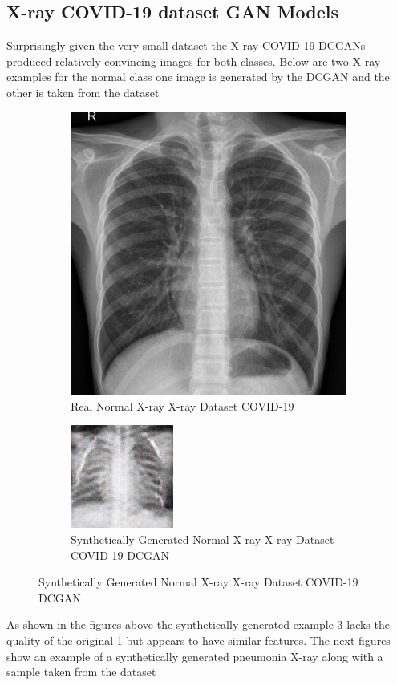 \subsection{X-ray COVID-19 dataset GAN Models}
Surprisingly given the very small dataset the X-ray COVID-19 DCGANs produced relatively convincing images for both classes.  Below are two X-ray examples for the normal class one image is generated by the DCGAN and the other is taken from the dataset
 \begin{figure}[H]
    \centering
    \begin{subfigure}{.4\textwidth}
    \centering
      \includegraphics[width=.4\linewidth,keepaspectratio]{Images/ExampleOfNormalXrayXrayCOVID19Dataset.jpeg}
      \caption{Real Normal X-ray X-ray Dataset COVID-19}
      \label{fig:Real Normal X-ray X-ray Dataset COVID-19}
    \end{subfigure}\hfill%
    \begin{subfigure}{.4\textwidth}
    \centering
      \includegraphics[width=.4\linewidth,keepaspectratio]{Images/ExampleOfSyntheticallyGeneratedNormalXrayCOVID19XrayDatasetDCGAN.png}
      \caption{Synthetically Generated Normal X-ray X-ray Dataset COVID-19 DCGAN}
      \label{fig:Synthetically Generated Normal X-ray X-ray Dataset COVID-19 DCGAN}
    \end{subfigure}\hfill%
\end{figure}
As shown in the figures above the synthetically generated example \ref{fig:Synthetically Generated Normal X-ray X-ray Dataset COVID-19 DCGAN} lacks the quality of the original \ref{fig:Real Normal X-ray X-ray Dataset COVID-19} but appears to have similar features.  The next figures show an example of a synthetically generated pneumonia X-ray along with a sample taken from the dataset
